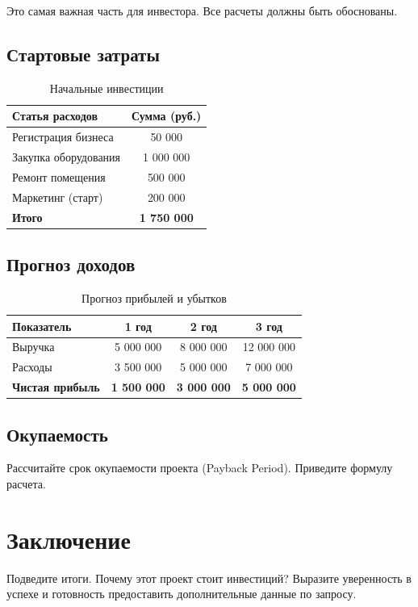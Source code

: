 \documentclass[a4paper,12pt]{article}
\begin{document}
Это самая важная часть для инвестора. Все расчеты должны быть обоснованы.

\subsection{Стартовые затраты}
\begin{table}[h!]
\centering
\begin{tabular}{lc}
\toprule
\textbf{Статья расходов} & \textbf{Сумма (руб.)} \\
\midrule
Регистрация бизнеса & 50 000 \\
Закупка оборудования & 1 000 000 \\
Ремонт помещения & 500 000 \\
Маркетинг (старт) & 200 000 \\
\midrule
\textbf{Итого} & \textbf{1 750 000} \\
\bottomrule
\end{tabular}
\caption{Начальные инвестиции}
\end{table}

\subsection{Прогноз доходов}
\begin{table}[h!]
\centering
\begin{tabular}{lccc}
\toprule
\textbf{Показатель} & \textbf{1 год} & \textbf{2 год} & \textbf{3 год} \\
\midrule
Выручка & 5 000 000 & 8 000 000 & 12 000 000 \\
Расходы & 3 500 000 & 5 000 000 & 7 000 000 \\
\midrule
\textbf{Чистая прибыль} & \textbf{1 500 000} & \textbf{3 000 000} & \textbf{5 000 000} \\
\bottomrule
\end{tabular}
\caption{Прогноз прибылей и убытков}
\end{table}

\subsection{Окупаемость}
Рассчитайте срок окупаемости проекта (Payback Period). Приведите формулу расчета.

\newpage
\section{Заключение}

Подведите итоги. Почему этот проект стоит инвестиций? Выразите уверенность в успехе и готовность предоставить дополнительные данные по запросу.
\end{document}
